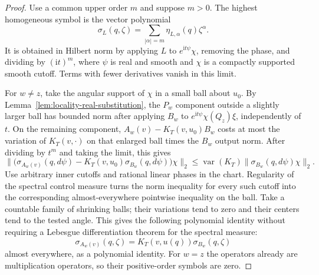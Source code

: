 \begin{proof}
Use a common upper order $m$ and suppose $m>0$.  The highest
homogeneous symbol is the vector polynomial
\[
 \sigma_L(q,\zeta)
   =\sum_{|\alpha|=m}\eta_{L,\alpha}(q)\zeta^\alpha.
\]
It is obtained in Hilbert norm by applying $L$ to
$e^{\mathrm i t\psi}\chi$, removing the phase, and dividing by
$(\mathrm i t)^m$, where $\psi$ is real and smooth and $\chi$ is a
compactly supported smooth cutoff.  Terms with fewer derivatives
vanish in this limit.

For $w\ne z$, take the angular support of $\chi$ in a small ball
about $u_0$.  By Lemma~\ref{lem:locality-real-substitution}, the
$P_w$ component outside a slightly larger ball has bounded norm
after applying $B_w$ to
$e^{\mathrm i t\psi}\chi(Q_z)\xi$, independently of $t$.  On the
remaining component,
$A_w(v)-K_T(v,u_0)B_w$ costs at most the variation of
$K_T(v,\cdot)$ on that enlarged ball times the $B_w$ output norm.
After dividing by $t^m$ and taking the limit, this gives
\[
 \|\big(\sigma_{A_w(v)}(q,d\psi)
       -K_T(v,u_0)\sigma_{B_w}(q,d\psi)\big)\chi\|_2
 \le \operatorname{var}(K_T)
       \|\sigma_{B_w}(q,d\psi)\chi\|_2.
\]
Use arbitrary inner cutoffs and rational linear phases in the chart.
Regularity of the spectral control measure turns the norm inequality
for every such cutoff into the corresponding almost-everywhere pointwise
inequality on the ball. Take a countable family of shrinking balls; their
variations tend to zero and their centers tend to the tested angle.
This gives the following polynomial identity without requiring a
Lebesgue differentiation theorem for the spectral measure:
\begin{equation}
 \sigma_{A_w(v)}(q,\zeta)
       =K_T(v,u(q))\sigma_{B_w}(q,\zeta)
 \label{eq:locality-symbol-comparison}
\end{equation}
almost everywhere, as a polynomial identity.  For $w=z$ the
operators already are multiplication operators, so their
positive-order symbols are zero.


\end{proof}
